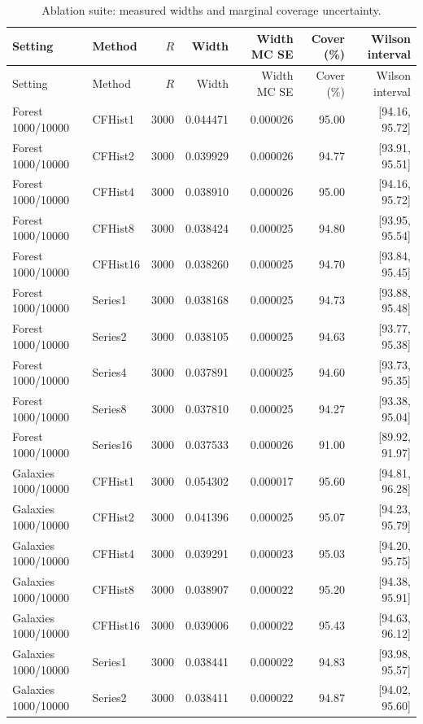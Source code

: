 \begin{longtable}{llrrrrr}
\caption{Ablation suite: measured widths and marginal coverage uncertainty.}\label{tab:fullablation}\\
\toprule Setting & Method & $R$ & Width & Width MC SE & Cover (\%) & Wilson interval\\\midrule\endfirsthead
\toprule Setting & Method & $R$ & Width & Width MC SE & Cover (\%) & Wilson interval\\\midrule\endhead
Forest 1000/10000 & CFHist1 & 3000 & 0.044471 & 0.000026 & 95.00 & [94.16, 95.72]\\
Forest 1000/10000 & CFHist2 & 3000 & 0.039929 & 0.000026 & 94.77 & [93.91, 95.51]\\
Forest 1000/10000 & CFHist4 & 3000 & 0.038910 & 0.000026 & 95.00 & [94.16, 95.72]\\
Forest 1000/10000 & CFHist8 & 3000 & 0.038424 & 0.000025 & 94.80 & [93.95, 95.54]\\
Forest 1000/10000 & CFHist16 & 3000 & 0.038260 & 0.000025 & 94.70 & [93.84, 95.45]\\
Forest 1000/10000 & Series1 & 3000 & 0.038168 & 0.000025 & 94.73 & [93.88, 95.48]\\
Forest 1000/10000 & Series2 & 3000 & 0.038105 & 0.000025 & 94.63 & [93.77, 95.38]\\
Forest 1000/10000 & Series4 & 3000 & 0.037891 & 0.000025 & 94.60 & [93.73, 95.35]\\
Forest 1000/10000 & Series8 & 3000 & 0.037810 & 0.000025 & 94.27 & [93.38, 95.04]\\
Forest 1000/10000 & Series16 & 3000 & 0.037533 & 0.000026 & 91.00 & [89.92, 91.97]\\
Galaxies 1000/10000 & CFHist1 & 3000 & 0.054302 & 0.000017 & 95.60 & [94.81, 96.28]\\
Galaxies 1000/10000 & CFHist2 & 3000 & 0.041396 & 0.000025 & 95.07 & [94.23, 95.79]\\
Galaxies 1000/10000 & CFHist4 & 3000 & 0.039291 & 0.000023 & 95.03 & [94.20, 95.75]\\
Galaxies 1000/10000 & CFHist8 & 3000 & 0.038907 & 0.000022 & 95.20 & [94.38, 95.91]\\
Galaxies 1000/10000 & CFHist16 & 3000 & 0.039006 & 0.000022 & 95.43 & [94.63, 96.12]\\
Galaxies 1000/10000 & Series1 & 3000 & 0.038441 & 0.000022 & 94.83 & [93.98, 95.57]\\
Galaxies 1000/10000 & Series2 & 3000 & 0.038411 & 0.000022 & 94.87 & [94.02, 95.60]\\

\end{longtable}
